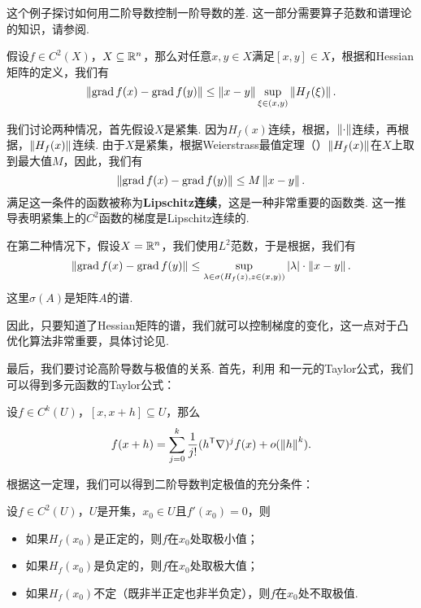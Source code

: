 \begin{example}\label{ex:lagrange-finite-multi}
这个例子探讨如何用二阶导数控制一阶导数的差. 这一部分需要算子范数和谱理论的知识，请参阅. 

假设$f\in C^2(X)$，$X\subseteq\mathbb{R}^n$，那么对任意$x,y\in X$满足$[x,y]\in X$，根据和Hessian矩阵的定义，我们有
\[\left\|\operatorname*{grad} f(x)-\operatorname*{grad} f(y)\right\|\leq \left\|x-y\right\|\sup_{\xi\in(x,y)}\left\|H_f(\xi)\right\|.\]

我们讨论两种情况，首先假设$X$是紧集. 因为$H_f(x)$连续，根据，$\left\|\cdot\right\|$连续，再根据，$\left\|H_f(x)\right\|$连续. 由于$X$是紧集，根据Weierstrass最值定理（）$\left\|H_f(x)\right\|$在$X$上取到最大值$M$，因此，我们有
\[\left\|\operatorname*{grad} f(x)-\operatorname*{grad} f(y)\right\|\leq M\left\|x-y\right\|.\]
满足这一条件的函数被称为\textbf{Lipschitz连续}，这是一种非常重要的函数类. 这一推导表明紧集上的$C^2$函数的梯度是Lipschitz连续的. 

在第二种情况下，假设$X=\mathbb{R}^n$，我们使用$L^2$范数，于是根据，我们有
\[\left\|\operatorname*{grad} f(x)-\operatorname*{grad} f(y)\right\|\leq\sup_{\lambda\in\sigma(H_f(z),z\in(x,y))}|\lambda|\cdot \left\|x-y\right\|.\]
这里$\sigma(A)$是矩阵$A$的谱. 

因此，只要知道了Hessian矩阵的谱，我们就可以控制梯度的变化，这一点对于凸优化算法非常重要，具体讨论见.
\end{example}

最后，我们要讨论高阶导数与极值的关系. 首先，利用 和一元的Taylor公式，我们可以得到多元函数的Taylor公式：

\begin{theorem}[Taylor展开]
    设$f\in C^k(U)$，$[x,x+h]\subseteq U$，那么
    \[
        f(x+h)=\sum_{j=0}^k\frac{1}{j!}(h^{\mathsf{T}}\nabla)^jf(x)+o(\left\|h\right\|^k).
    \]
\end{theorem}

根据这一定理，我们可以得到二阶导数判定极值的充分条件：

\begin{theorem}\label{thm:second-derivative-test}
    设$f\in C^2(U)$，$U$是开集，$x_0\in U$且$f'(x_0)=0$，则
    \begin{itemize}
        \item 如果$H_f(x_0)$是正定的，则$f$在$x_0$处取极小值；
        \item 如果$H_f(x_0)$是负定的，则$f$在$x_0$处取极大值；
        \item 如果$H_f(x_0)$不定（既非半正定也非半负定），则$f$在$x_0$处不取极值.
    \end{itemize}
\end{theorem}

